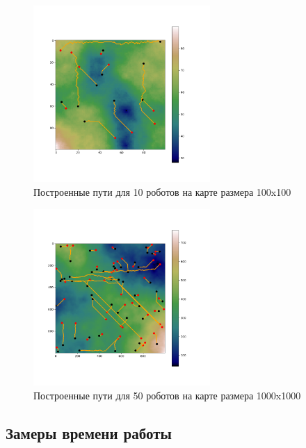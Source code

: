 \documentclass{article}
\numberwithin{equation}{section}
\begin{document}
			\begin{figure}[H]
				\centering
				\vspace{-0.5cm}
				\includegraphics[width=0.6\textwidth]{data/mean_paths/100x100/10.png}
				\vspace{-0.5cm}
				\caption{Построенные пути для 10 роботов на карте размера 100x100}\label{fig:5robs}
			\end{figure}

			\begin{figure}[H]
				\centering
				\vspace{-0.5cm}
				\includegraphics[width=0.6\textwidth]{data/mean_paths/1000x1000/50.png}
				\vspace{-0.5cm}
				\caption{Построенные пути для 50 роботов на карте размера 1000x1000}\label{fig:50robs}
			\end{figure}

		\subsection{Замеры времени работы}
\end{document}
